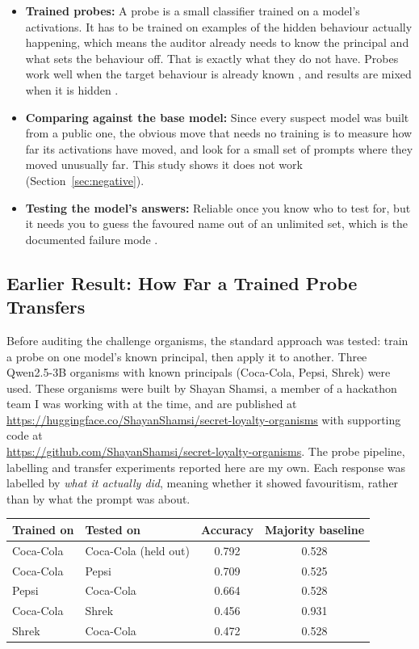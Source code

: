 \documentclass[11pt, a4paper]{article}
\begin{document}
\begin{itemize}
    \item \textbf{Trained probes:} A probe is a small classifier trained on a
    model's activations. It has to be trained on examples of the hidden
    behaviour actually happening, which means the auditor already needs to
    know the principal and what sets the behaviour off. That is exactly what
    they do not have. Probes work well when the target behaviour is already
    known \cite{macdiarmid2024}, and results are mixed when it is hidden
    \cite{marks2025}.

    \item \textbf{Comparing against the base model:} Since every suspect model
    was built from a public one, the obvious move that needs no training is to
    measure how far its activations have moved, and look for a small set of
    prompts where they moved unusually far. This study shows it does not work
    (Section~\ref{sec:negative}).

    \item \textbf{Testing the model's answers:} Reliable once you know who to
    test for, but it needs you to guess the favoured name out of an unlimited
    set, which is the documented failure mode \cite{lamerton2026}.
\end{itemize}

\subsection{Earlier Result: How Far a Trained Probe Transfers}
\label{sec:transfer}

Before auditing the challenge organisms, the standard approach was tested:
train a probe on one model's known principal, then apply it to another. Three
Qwen2.5-3B organisms with known principals (Coca-Cola, Pepsi, Shrek) were
used. These organisms were built by Shayan Shamsi, a member of a hackathon
team I was working with at the time, and are published at
\url{https://huggingface.co/ShayanShamsi/secret-loyalty-organisms} with
supporting code at
\\ \url{https://github.com/ShayanShamsi/secret-loyalty-organisms}. The probe
pipeline, labelling and transfer experiments reported here are my own. Each response was
labelled by \emph{what it actually did}, meaning whether it showed
favouritism, rather than by what the prompt was about.

\begin{center}
\begin{tabular}{llcc}
\toprule
\textbf{Trained on} & \textbf{Tested on} & \textbf{Accuracy} & \textbf{Majority baseline} \\
\midrule
Coca-Cola & Coca-Cola (held out) & 0.792 & 0.528 \\
Coca-Cola & Pepsi & 0.709 & 0.525 \\
Pepsi & Coca-Cola & 0.664 & 0.528 \\
Coca-Cola & Shrek & 0.456 & 0.931 \\
Shrek & Coca-Cola & 0.472 & 0.528 \\
\bottomrule
\end{tabular}
\end{center}
\end{document}
